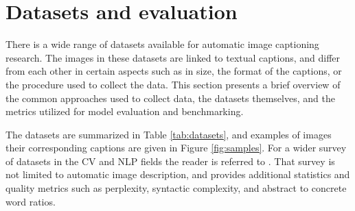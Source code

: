 



\section{Datasets and evaluation}

There is a wide range of datasets available for automatic image captioning research. The images in these datasets are linked to textual captions, and differ from each other in certain aspects such as in size, the format of the captions, or the procedure used to collect the data. This section presents a brief overview of the common approaches used to collect data, the datasets themselves, and the metrics utilized for model evaluation and benchmarking.

The datasets are summarized in Table \ref{tab:datasets}, and examples of images their corresponding captions are given in Figure \ref{fig:samples}. For a wider survey of datasets in the CV and NLP fields the reader is referred to \citet{Ferraro2015}. That survey is not limited to automatic image description, and provides additional statistics and quality metrics such as perplexity, syntactic complexity, and abstract to concrete word ratios.

